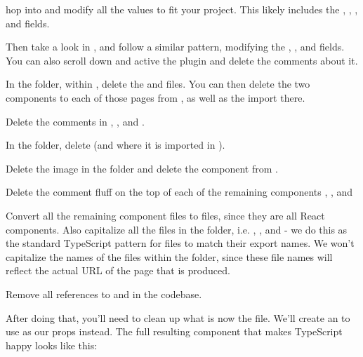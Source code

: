 \documentclass[a4paper,
                             oneside,
                             BCOR1.0cm,
                             DIV11,
                             parskip=full,
                             11pt]{scrbook}
\begin{document}
\begin{arrows}
\item hop into  and modify all the values to fit your project. This likely includes the , , , and  fields. 
\item Then take a look in , and follow a similar pattern, modifying the , , and  fields. You can also scroll down and active the  plugin and delete the comments about it.
\item In the  folder, within , delete the  and  files. You can then delete the two  components to each of those pages from , as well as the  import there.
\item Delete the comments in , , and .
\item In the  folder, delete  (and where it is imported in ).
\item Delete the  image in the  folder and delete the  component from .
\item Delete the comment fluff on the top of each of the remaining components , , and 
\item Convert all the remaining component files to  files, since they are all React components. Also capitalize all the files in the  folder, i.e. , , and  - we do this as the standard TypeScript pattern for files to match their export names. We won't capitalize the names of the files within the  folder, since these file names will reflect the actual URL of the page that is produced.
\item Remove all references to  and  in the codebase.
\item After doing that, you'll need to clean up what is now the  file. We'll create an  to use as our props instead. The full resulting component that makes TypeScript happy looks like this:


\end{arrows}
\end{document}

